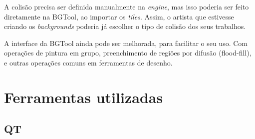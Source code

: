 \documentclass[brazil]{abnt}
\begin{document}

A colisão precisa ser definida manualmente na \textit{engine}, mas isso poderia ser feito diretamente na BGTool, ao importar os \textit{tiles}. Assim, o artista que estivesse criando os \textit{backgrounds} poderia já escolher o tipo de colisão dos seus trabalhos.

A interface da BGTool ainda pode ser melhorada, para facilitar o seu uso. Com operações de pintura em grupo, preenchimento de regiões por difusão (flood-fill), e outras operações comuns em ferramentas de desenho.





\anexo

\chapter{Ferramentas utilizadas}

\section{QT}
\end{document}
